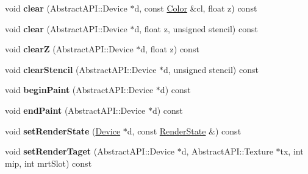 \begin{DoxyCompactItemize}
\item 
\hypertarget{class_tempest_1_1_direct_x9_a923f705de37c9743e43a4f6d0478df1c}{void {\bfseries clear} (Abstract\+A\+P\+I\+::\+Device $\ast$d, const \hyperlink{class_tempest_1_1_color}{Color} \&cl, float z) const }\label{class_tempest_1_1_direct_x9_a923f705de37c9743e43a4f6d0478df1c}

\item 
\hypertarget{class_tempest_1_1_direct_x9_a91314b6b0e5d4f1ebc6ef9c51165b48e}{void {\bfseries clear} (Abstract\+A\+P\+I\+::\+Device $\ast$d, float z, unsigned stencil) const }\label{class_tempest_1_1_direct_x9_a91314b6b0e5d4f1ebc6ef9c51165b48e}

\item 
\hypertarget{class_tempest_1_1_direct_x9_aa3bc0c3449f3576695fba69974a641cc}{void {\bfseries clear\+Z} (Abstract\+A\+P\+I\+::\+Device $\ast$d, float z) const }\label{class_tempest_1_1_direct_x9_aa3bc0c3449f3576695fba69974a641cc}

\item 
\hypertarget{class_tempest_1_1_direct_x9_af43614846b92a546f4e6ee57716163b3}{void {\bfseries clear\+Stencil} (Abstract\+A\+P\+I\+::\+Device $\ast$d, unsigned stencil) const }\label{class_tempest_1_1_direct_x9_af43614846b92a546f4e6ee57716163b3}

\item 
\hypertarget{class_tempest_1_1_direct_x9_a5257e82fe164fde620a00ad5be254efb}{void {\bfseries begin\+Paint} (Abstract\+A\+P\+I\+::\+Device $\ast$d) const }\label{class_tempest_1_1_direct_x9_a5257e82fe164fde620a00ad5be254efb}

\item 
\hypertarget{class_tempest_1_1_direct_x9_a7a378f4b41fc111fa08b3b21753fab97}{void {\bfseries end\+Paint} (Abstract\+A\+P\+I\+::\+Device $\ast$d) const }\label{class_tempest_1_1_direct_x9_a7a378f4b41fc111fa08b3b21753fab97}

\item 
\hypertarget{class_tempest_1_1_direct_x9_a662597640fa69fb0238e6b2f09a410a4}{void {\bfseries set\+Render\+State} (\hyperlink{struct_direct_x9_1_1_device}{Device} $\ast$d, const \hyperlink{class_tempest_1_1_render_state}{Render\+State} \&) const }\label{class_tempest_1_1_direct_x9_a662597640fa69fb0238e6b2f09a410a4}

\item 
\hypertarget{class_tempest_1_1_direct_x9_ac3fa20cc037ad1bb3cf32aa942348e6d}{void {\bfseries set\+Render\+Taget} (Abstract\+A\+P\+I\+::\+Device $\ast$d, Abstract\+A\+P\+I\+::\+Texture $\ast$tx, int mip, int mrt\+Slot) const }\label{class_tempest_1_1_direct_x9_ac3fa20cc037ad1bb3cf32aa942348e6d}


\end{DoxyCompactItemize}
